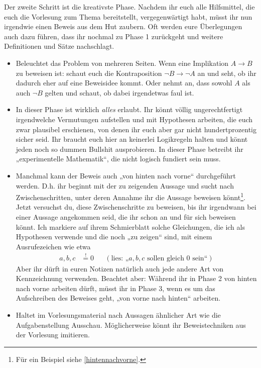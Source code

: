  \begin{de}
  Der zweite Schritt ist die kreativste Phase. Nachdem ihr euch alle Hilfsmittel, die euch die Vorlesung zum Thema bereitstellt, vergegenwärtigt habt, müsst ihr nun irgendwie einen Beweis aus dem Hut zaubern. Oft werden eure Überlegungen auch dazu führen, dass ihr nochmal zu Phase 1 zurückgeht und weitere Definitionen und Sätze nachschlagt.
  \begin{itemize}
   \item Beleuchtet das Problem von mehreren Seiten. Wenn eine Implikation $A\to B$ zu beweisen ist: schaut euch die Kontraposition $\neg B\to \neg A$ an und seht, ob ihr dadurch eher auf eine Beweisidee kommt. Oder nehmt an, dass sowohl $A$ als auch $\neg B$ gelten und schaut, ob dabei irgendetwas faul ist.
   \item In dieser Phase ist wirklich \emph{alles} erlaubt. Ihr könnt völlig ungerechtfertigt irgendwelche Vermutungen aufstellen und mit Hypothesen arbeiten, die euch zwar plausibel erschienen, von denen ihr euch aber gar nicht hundertprozentig sicher seid. Ihr braucht euch hier an keinerlei Logikregeln halten und könnt jeden noch so dummen Bullshit ausprobieren. In dieser Phase betreibt ihr „experimentelle Mathematik“, die nicht logisch fundiert sein muss.
   \item Manchmal kann der Beweis auch „von hinten nach vorne“ durchgeführt werden. D.h. ihr beginnt mit der zu zeigenden Aussage und sucht nach Zwischenschritten, unter deren Annahme ihr die Aussage beweisen könnt\footnote{Für ein Beispiel siehe \cref{hintennachvorne}.}. Jetzt versuchst du, diese Zwischenschritte zu beweisen, bis ihr irgendwann bei einer Aussage angekommen seid, die ihr schon an und für sich beweisen könnt. Ich markiere auf ihrem Schmierblatt solche Gleichungen, die ich als Hypothesen verwende und die noch „zu zeigen“ sind, mit einem Ausrufezeichen wie etwa
   \begin{align*}
    a,b,c & \stackrel{!}{=} 0 && (\text{lies: „$a,b,c$ sollen gleich $0$ sein“})
   \end{align*}
   Aber ihr dürft in euren Notizen natürlich auch jede andere Art von Kennzeichnung verwenden. Beachtet aber: Während ihr in Phase 2 von hinten nach vorne arbeiten dürft, müsst ihr in Phase 3, wenn es um das Aufschreiben des Beweises geht, „von vorne nach hinten“ arbeiten.
   \item Haltet im Vorlesungsmaterial nach Aussagen ähnlicher Art wie die Aufgabenstellung Ausschau. Möglicherweise könnt ihr Beweistechniken aus der Vorlesung imitieren.

\end{itemize}
\end{de}
